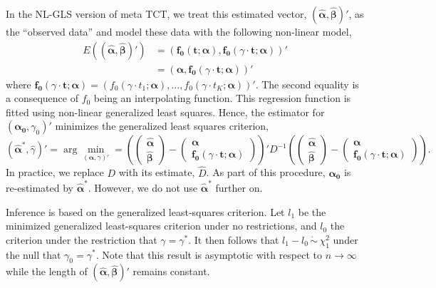 \documentclass[
]{article}
\begin{document}
In the NL-GLS version of meta TCT, we treat this estimated vector, \((\hat{\boldsymbol{\alpha}}, \hat{\boldsymbol{\beta}})'\),
as the ``observed data'' and model these data with the following non-linear model,
\[ \begin{split}
    E\left( (\hat{\boldsymbol{\alpha}}, \hat{\boldsymbol{\beta}})' \right) & = \left( \boldsymbol{f_0}(\boldsymbol{t}; \boldsymbol{\alpha}), \boldsymbol{f_0}(\gamma \cdot \boldsymbol{t}; \boldsymbol{\alpha}) \right)' \\
    & = \left( \boldsymbol{\alpha},  \boldsymbol{f_0}(\gamma \cdot \boldsymbol{t}; \boldsymbol{\alpha}) \right)'
\end{split} \]
where \(\boldsymbol{f_0}(\gamma \cdot \boldsymbol{t}; \boldsymbol{\alpha}) = (f_0(\gamma \cdot t_1; \boldsymbol{\alpha}), ..., f_0(\gamma \cdot t_K; \boldsymbol{\alpha}))'\).
The second equality is a consequence of \(f_0\) being an interpolating function.
This regression function is fitted using non-linear generalized least squares.
Hence, the estimator for \((\boldsymbol{\alpha_0}, \gamma_0)'\) minimizes the generalized least squares criterion,
\[
    (\hat{\boldsymbol{\alpha}}^*, \hat{\gamma})' = \arg \min_{(\boldsymbol{\alpha}, \gamma)'} = \left( \begin{pmatrix}
        \hat{\boldsymbol{\alpha}} \\
        \hat{\boldsymbol{\beta}}
    \end{pmatrix} - \begin{pmatrix}
        \boldsymbol{\alpha} \\
        \boldsymbol{f_0}(\gamma \cdot \boldsymbol{t}; \boldsymbol{\alpha})
    \end{pmatrix} \right)' D^{-1} \left( \begin{pmatrix}
        \hat{\boldsymbol{\alpha}} \\
        \hat{\boldsymbol{\beta}}
    \end{pmatrix} - \begin{pmatrix}
        \boldsymbol{\alpha} \\
        \boldsymbol{f_0}(\gamma \cdot \boldsymbol{t}; \boldsymbol{\alpha})
    \end{pmatrix}  \right).
\]
In practice, we replace \(D\) with its estimate, \(\hat{D}\). As part of this
procedure, \(\boldsymbol{\alpha_0}\) is re-estimated by
\(\hat{\boldsymbol{\alpha}}^*\). However, we do not use
\(\hat{\boldsymbol{\alpha}}^*\) further on.

Inference is based on the generalized least-squares criterion. Let \(l_1\) be the
minimized generalized least-squares criterion under no restrictions, and \(l_0\)
the criterion under the restriction that \(\gamma = \gamma^*\). It then follows
that \(l_1 - l_0 \, \dot\sim \, \chi^2_1\) under the null that \(\gamma_0 = \gamma^*\). Note that this result is asymptotic with respect to \(n \to \infty\)
while the length of \((\hat{\boldsymbol{\alpha}}, \hat{\boldsymbol{\beta}})'\)
remains constant.
\end{document}

